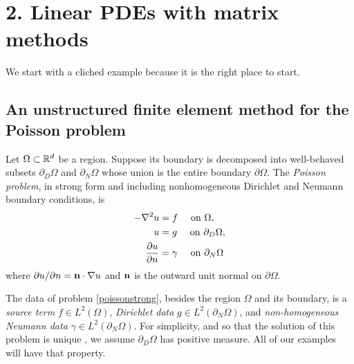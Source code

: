 
\chapter{2. Linear PDEs with matrix methods}

We start with a cliched example because it is the right place to start.

\section{An unstructured finite element method for the Poisson problem}

Let $\Omega \subset \mathbb{R}^d$ be a region.  Suppose its boundary is decomposed into well-behaved subsets $\partial_D \Omega$ and $\partial_N \Omega$ whose union is the entire boundary $\partial \Omega$.  The \emph{Poisson problem}, in strong form and including nonhomogeneous Dirichlet and Neumann boundary conditions, is
\begin{align}
- \nabla^2 u &= f \quad \text{ on } \Omega, \label{poissonstrong} \\
u &= g \quad \text{ on } \partial_D \Omega, \notag \\
\frac{\partial u}{\partial n} &= \gamma \quad \text{ on } \partial_N \Omega \notag
\end{align}
where $\partial u/\partial n = \mathbf{n} \cdot \nabla u$ and $\mathbf{n}$ is the outward unit normal on $\partial \Omega$.

The data of problem \eqref{poissonstrong}, besides the region $\Omega$ and its boundary, is a \emph{source term} $f\in L^2(\Omega)$, \emph{Dirichlet data} $g\in L^2(\partial_N \Omega)$, and \emph{non-homogeneous Neumann data} $\gamma\in L^2(\partial_N \Omega)$.  For simplicity, and so that the solution of this problem is unique \citep{Elmanetal2005}, we assume $\partial_D \Omega$ has positive measure.  All of our examples will have that property.

